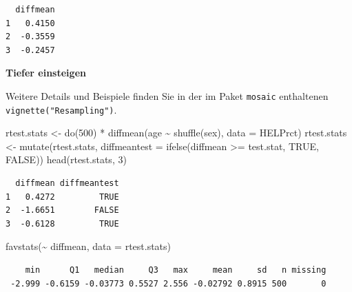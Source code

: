 \documentclass[
  ngerman,
]{scrbook}
\newenvironment{Shaded}{\begin{snugshade}}{\end{snugshade}}
\newcommand{\AttributeTok}[1]{\textcolor[rgb]{0.77,0.63,0.00}{#1}}
\newcommand{\ConstantTok}[1]{\textcolor[rgb]{0.00,0.00,0.00}{#1}}
\newcommand{\DecValTok}[1]{\textcolor[rgb]{0.00,0.00,0.81}{#1}}
\newcommand{\FunctionTok}[1]{\textcolor[rgb]{0.00,0.00,0.00}{#1}}
\newcommand{\NormalTok}[1]{#1}
\newcommand{\OtherTok}[1]{\textcolor[rgb]{0.56,0.35,0.01}{#1}}
\newcommand{\SpecialCharTok}[1]{\textcolor[rgb]{0.00,0.00,0.00}{#1}}
\newenvironment{tiefereinsteigen}[1]
  {
  \begin{itemize}
  \renewcommand{\labelitemi}{
    \raisebox{2.6\height}[0pt][0pt]{
      {\setkeys{Gin}{width=7em,keepaspectratio}
        {\normalsize \textcolor{dark-fom-green}\faSearch}}
        }
  }
  \begin{blackbox}
         \bgroup\color{dark-fom-green}
          {\textbf{Tiefer einsteigen}}
        \egroup
  \item
  }
  {
  \end{blackbox}
  \end{itemize}
  }
\begin{document}
\begin{verbatim}
  diffmean
1   0.4150
2  -0.3559
3  -0.2457
\end{verbatim}

\begin{tiefereinsteigen}{tiefereinsteigen}
Weitere Details und Beispiele finden Sie in der im Paket \texttt{mosaic} enthaltenen \texttt{vignette("Resampling")}.

\end{tiefereinsteigen}

\begin{Shaded}
\begin{Highlighting}[]
\NormalTok{rtest.stats }\OtherTok{\textless{}{-}} \FunctionTok{do}\NormalTok{(}\DecValTok{500}\NormalTok{) }\SpecialCharTok{*} \FunctionTok{diffmean}\NormalTok{(age }\SpecialCharTok{\textasciitilde{}} \FunctionTok{shuffle}\NormalTok{(sex), }
  \AttributeTok{data =}\NormalTok{ HELPrct)}
\NormalTok{rtest.stats }\OtherTok{\textless{}{-}} \FunctionTok{mutate}\NormalTok{(rtest.stats, }
                      \AttributeTok{diffmeantest =} 
                        \FunctionTok{ifelse}\NormalTok{(diffmean }\SpecialCharTok{\textgreater{}=}\NormalTok{ test.stat, }\ConstantTok{TRUE}\NormalTok{, }\ConstantTok{FALSE}\NormalTok{))}
\FunctionTok{head}\NormalTok{(rtest.stats, }\DecValTok{3}\NormalTok{)}
\end{Highlighting}
\end{Shaded}

\begin{verbatim}
  diffmean diffmeantest
1   0.4272         TRUE
2  -1.6651        FALSE
3  -0.6128         TRUE
\end{verbatim}

\begin{Shaded}
\begin{Highlighting}[]
\FunctionTok{favstats}\NormalTok{(}\SpecialCharTok{\textasciitilde{}}\NormalTok{ diffmean, }\AttributeTok{data =}\NormalTok{ rtest.stats)}
\end{Highlighting}
\end{Shaded}

\begin{verbatim}
    min      Q1   median     Q3   max     mean     sd   n missing
 -2.999 -0.6159 -0.03773 0.5527 2.556 -0.02792 0.8915 500       0
\end{verbatim}
\end{document}
